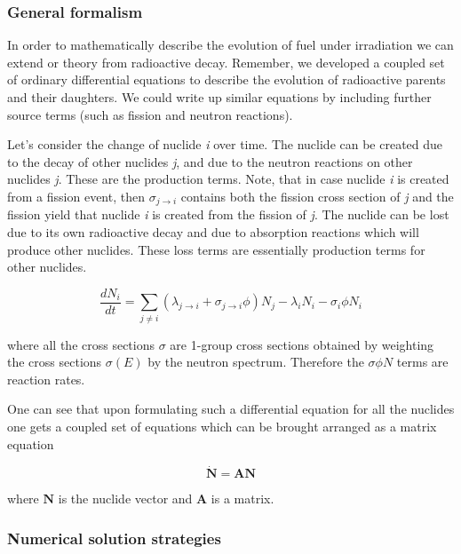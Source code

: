 \subsubsection*{General formalism}

In order to mathematically describe the  evolution of fuel under irradiation we can extend or theory from radioactive decay. Remember, we developed a coupled set of ordinary differential equations to describe the evolution of radioactive parents and their daughters. We could write up similar equations by including further source terms (such as fission and neutron reactions).

Let's consider the change of nuclide \textit{i} over time. The nuclide can be created due to the decay of other nuclides \textit{j}, and due to the neutron reactions on other nuclides \textit{j}. These are the production terms. Note, that in case nuclide \textit{i} is created from a fission event, then $\sigma_{j\rightarrow i}$ contains both the fission cross section of \textit{j} and the fission yield that nuclide \textit{i} is created from the fission of \textit{j}. The nuclide can be lost due to its own radioactive decay and due to absorption reactions which will produce other nuclides. These loss terms are essentially production terms for other nuclides.

\begin{equation}
\frac{dN_{i}}{dt} =\sum _{j\neq i}\left( \lambda _{j\rightarrow i} +\sigma _{j\rightarrow i} \phi\right) N_{j} -\lambda _{i} N_{i} -\sigma _{i} \phi N_{i}
\end{equation}

\noindent where all the cross sections $\sigma$ are 1-group cross sections obtained by weighting the cross sections $\sigma(E)$ by the neutron spectrum. Therefore the $\sigma\phi N$ terms are reaction rates.

One can see that upon formulating such a differential equation for all the nuclides one gets a coupled set of equations which can be brought arranged as a matrix equation

\begin{equation}
\dot{\mathbf{N}}=\mathbf{AN}
\end{equation}

\noindent where $\mathbf{N}$ is the nuclide vector and $\mathbf{A}$ is a matrix.

\subsubsection*{Numerical solution strategies}

